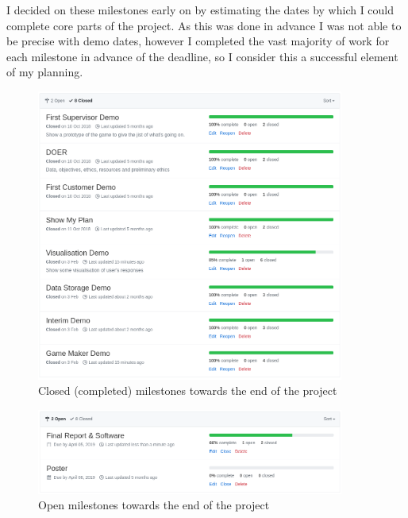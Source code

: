 I decided on these milestones early on by estimating the dates by which I could complete core parts of the project. As this was done in advance I was not able to be precise with demo dates, however I completed the vast majority of work for each milestone in advance of the deadline, so I consider this a successful element of my planning.

\begin{figure}[!h]
	\centering
	\includegraphics[width=0.9\textwidth]{./images/softeng/closed_milestones.png}
	\caption{Closed (completed) milestones towards the end of the project}
	\label{fig:closed_milestones}
\end{figure}

\begin{figure}[!h]
	\centering
	\includegraphics[width=0.9\textwidth]{./images/softeng/open_milestones.png}
	\caption{Open milestones towards the end of the project}
	\label{fig:open_milestones}
\end{figure}

